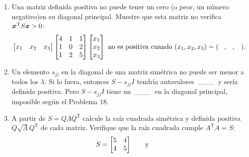 \documentclass[12pt,a4paper]{article}
\newcommand{\bi}[1]{\hbox{\boldmath$#1$}}
\newcommand\1{\mbox{\,\vrule height-0.8pt depth1.0pt width2pc\,}}
\newcommand\2{\mbox{\,\vrule height-0.8pt depth1.0pt width1pc\,}}
\DeclareRobustCommand\transp{^{\mathrm{T}}}
\newcommand\OG{\qquad\hbox{y}\qquad}
\newcommand{\la}{\lambda}
\newcommand{\La}{\Lambda}
\begin{document}
\begin{enumerate}
\[ A=\begin{bmatrix}
  a&b\\ c&d
\end{bmatrix}.
\]
\item Una matriz definida positiva no puede tener un cero (o peor, un número negativo)\linebreak en su diagonal principal. Muestre que esta matriz no verifica $\bi x\transp S \bi x > 0$:
%
\[\begin{bmatrix}x_1 & x_2 & x_3\end{bmatrix}
        \begin{bmatrix} 4&1&1\\ 1&0&2
        \\ 1&2&5  \end{bmatrix}
        \begin{bmatrix} x_1\\ x_2\\ x_3 \end{bmatrix}
        \hbox{ no es positiva cuando } (x_1,x_2,x_3)=(\quad
        ,\quad ,\quad ).
\]
%
\item Un elemento $s_{jj}$ en la diagonal de una matriz simétrica no puede ser menor a todos los $\la$. Si lo fuera, entonces $S-s_{jj}I$ tendría autovalores $\1$ y sería definida positiva. Pero $S -  s_{jj}I$ tiene un $\1$ en la diagonal principal, imposible según el Problema $18$.
\item A partir de $S=Q\La Q\transp $ calcule la raíz cuadrada simétrica y definida positiva $Q\sqrt{\La}Q\transp$ de cada matriz. Verifique que la raíz cuadrada cumple $A\transp A=S$:
%
\[
S=\begin{bmatrix} 5&4\\ 4&5\end{bmatrix}\OG
\]
\end{enumerate}
\end{document}
